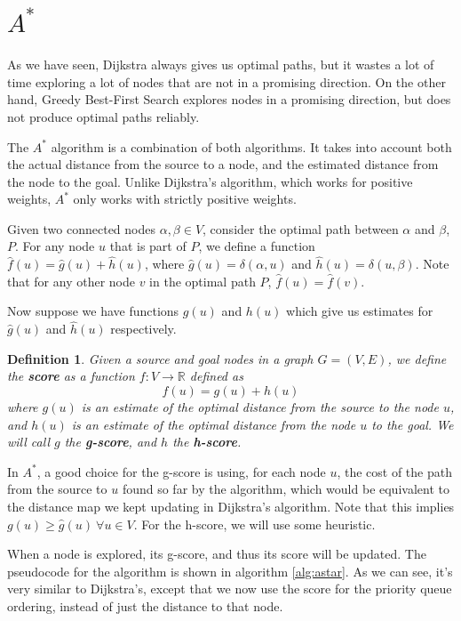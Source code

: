 \documentclass[12pt]{report}
\newtheorem{definition}[theorem]{Definition}
\begin{document}
\section{$A^*$}
\label{section:astar}
As we have seen, Dijkstra always gives us optimal paths, but it wastes a lot of time exploring a lot of nodes that are not in a promising direction. On the other hand, Greedy Best-First Search explores nodes in a promising direction, but does not produce optimal paths reliably.

The $A^*$ algorithm is a combination of both algorithms. It takes into account both the actual distance from the source to a node, and the estimated distance from the node to the goal. Unlike Dijkstra's algorithm, which works for positive weights, $A^*$ only works with strictly positive weights.

Given two connected nodes $\alpha, \beta \in V$, consider the optimal path between $\alpha$ and $\beta$, $P$. For any node $u$ that is part of $P$, we define a function $\hat{f}(u) = \hat{g}(u) + \hat{h}(u)$, where $\hat{g}(u) = \delta(\alpha, u)$ and $\hat{h}(u) = \delta(u, \beta)$. Note that for any other node $v$ in the optimal path $P$, $\hat{f}(u) = \hat{f}(v)$.

Now suppose we have functions $g(u)$ and $h(u)$ which give us estimates for $\hat{g}(u)$ and $\hat{h}(u)$ respectively.

\begin{definition}
Given a source and goal nodes in a graph $G = (V, E)$, we define the \textbf{score} as a function $f \colon V \to \mathbb{R}$ defined as
\begin{equation}
	f(u) = g(u) + h(u)
\end{equation}
where $g(u)$ is an estimate of the optimal distance from the source to the node $u$, and $h(u)$ is an estimate of the optimal distance from the node $u$ to the goal.
We will call $g$ the \textbf{g-score}, and $h$ the \textbf{h-score}.
\end{definition}

In $A^*$, a good choice for the g-score is using, for each node $u$, the cost of the path from the source to $u$ found so far by the algorithm, which would be equivalent to the distance map we kept updating in Dijkstra's algorithm. Note that this implies $g(u) \geq \hat{g}(u) \ \forall u \in V$. For the h-score, we will use some heuristic.

When a node is explored, its g-score, and thus its score will be updated. The pseudocode for the algorithm is shown in algorithm \ref{alg:astar}. As we can see, it's very similar to Dijkstra's, except that we now use the score for the priority queue ordering, instead of just the distance to that node.
\end{document}
